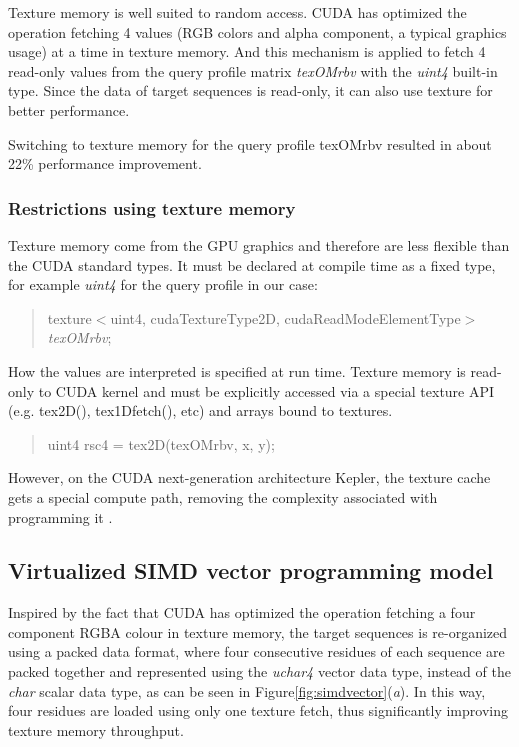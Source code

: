 Texture memory is well suited to random access. CUDA has optimized the operation fetching 4 values (RGB colors and alpha component, a typical graphics usage) at a time in texture memory. And this mechanism is applied to fetch 4 read-only values from the query profile matrix \emph{texOMrbv} with the \emph{uint4} built-in type. Since the data of target sequences is read-only, it can also use texture for better performance.

Switching to texture memory for the query profile texOMrbv resulted in about 22\% performance improvement.

\subsubsection*{Restrictions using texture memory}

Texture memory come from the GPU graphics and therefore are less flexible than the CUDA standard types. It must be declared at compile time as a fixed type, for example \emph{uint4} for the query profile in our case:

\begin{quote}
\selectfont
 texture$<$uint4, cudaTextureType2D, cudaReadModeElementType$>$ \emph{texOMrbv};
\end{quote}

How the values are interpreted is specified at run time. Texture memory is read-only to CUDA kernel and must be explicitly accessed via a special texture API (e.g. tex2D(), tex1Dfetch(), etc) and arrays bound to textures.

\begin{quote}
\selectfont
 uint4 rsc4 = tex2D(texOMrbv, x, y);
\end{quote}

However, on the CUDA next-generation architecture Kepler, the texture cache gets a special compute path, removing the complexity associated with programming it \citep{Kepler}.

\subsection{Virtualized SIMD vector programming model}

Inspired by the fact that CUDA has optimized the operation fetching a four component RGBA colour in texture memory, the target sequences is re-organized using a packed data format, where four consecutive residues of each sequence are packed together and represented using the \emph{uchar4} vector data type, instead of the \emph{char} scalar data type, as can be seen in Figure\ref{fig:simdvector}(\textit{a}). In this way, four residues are loaded using only one texture fetch, thus significantly improving texture memory throughput. 

